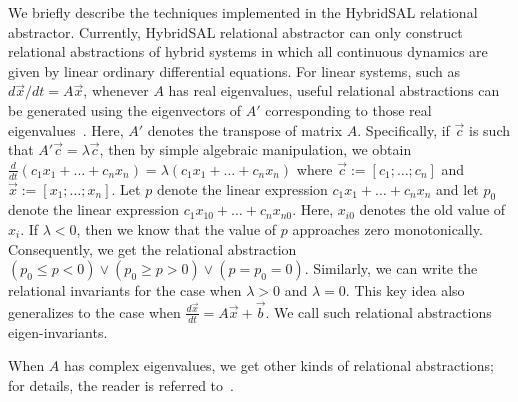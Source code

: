 \documentclass{article}
\begin{document}
We briefly describe the techniques implemented in the
HybridSAL relational abstractor.
Currently, HybridSAL relational abstractor can only construct
relational abstractions of hybrid systems in which all
continuous dynamics are given by linear ordinary differential
equations.
For linear systems, such as
$d\vec{x}/dt = A\vec{x}$, whenever $A$ has real eigenvalues, useful
relational abstractions can be generated using the eigenvectors of
${A'}$ corresponding to those real
eigenvalues~\cite{Tiwari03:HSCC}.  Here, ${A'}$ denotes the
transpose of matrix $A$.  Specifically, if $\vec{c}$ is such that
${A'}\vec{c} = \lambda \vec{c}$, then by simple algebraic
manipulation, we obtain $ \frac{d}{dt} (c_1 x_1 + \ldots + c_n x_n) =
\lambda (c_1 x_1 + \ldots + c_n x_n)$ where $\vec{c} :=
[c_1;\ldots;c_n]$ and $\vec{x} := [x_1;\ldots;x_n]$.  Let $p$ denote
the linear expression $c_1 x_1 + \ldots + c_n x_n$ and let $p_0$
denote the linear expression $c_1 x_{10} + \ldots + c_n x_{n0}$.  Here,
$x_{i0}$ denotes the old value of $x_i$.  If $\lambda < 0$, then we
know that the value of $p$ approaches zero monotonically.  Consequently, we
get the relational abstraction 
$ (p_0 \leq p < 0) \vee
  (p_0 \geq p > 0) \vee (p = p_0 = 0) $. Similarly, we can
write the relational invariants for the case when $\lambda > 0$ and
$\lambda = 0$.
This key idea also generalizes to the case when 
$\frac{d\vec{x}}{dt} = A\vec{x}+\vec{b}$.
We call such relational abstractions eigen-invariants.

When $A$ has complex eigenvalues, we get other kinds of
relational abstractions; for details, the reader is
referred to~\cite{Tiwari03:HSCC}.  
\end{document}
